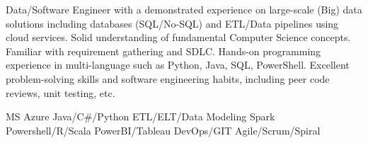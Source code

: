 \documentclass[a4paper]{ReadableCV}
\begin{document}
	






\showHeader



Data/Software Engineer with a demonstrated experience on large-scale (Big) data solutions including databases (SQL/No-SQL) and ETL/Data pipelines using cloud services. Solid understanding of fundamental Computer Science concepts. Familiar with requirement gathering and SDLC. Hands-on programming experience in multi-language such as Python, Java, SQL, PowerShell. Excellent problem-solving skills and software engineering habits, including peer code reviews, unit testing, etc.


	      {MS Azure}
		  {Java/C\#/Python}
		  {ETL/ELT/Data Modeling}
		  {Spark}
		  {Powershell/R/Scala}
		  {PowerBI/Tableau}
		  {DevOps/GIT}
		  {Agile/Scrum/Spiral}
		  

\end{document}
